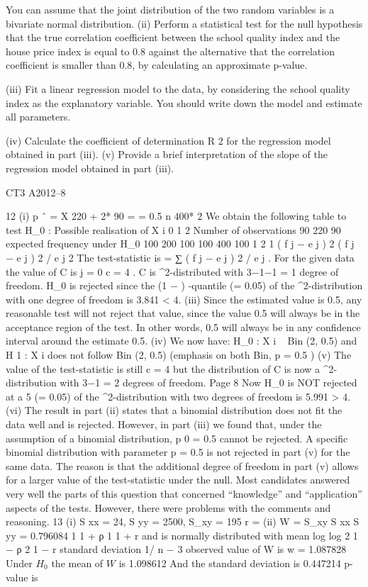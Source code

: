 \documentclass[a4paper,12pt]{article}
\begin{document}
You can assume that the joint distribution of the two random variables is a bivariate
normal distribution.
(ii) Perform a statistical test for the null hypothesis that the true correlation
coefficient between the school quality index and the house price index is
equal to 0.8 against the alternative that the correlation coefficient is smaller
than 0.8, by calculating an approximate p-value.

(iii) Fit a linear regression model to the data, by considering the school quality
index as the explanatory variable. You should write down the model and
estimate all parameters.

(iv) Calculate the coefficient of determination R 2 for the regression model
obtained in part (iii).
(v)
Provide a brief interpretation of the slope of the regression model obtained in
part (iii).



CT3 A2012–8


12
(i)
p ˆ =
X 220 + 2* 90
=
= 0.5
n
400* 2
We obtain the following table to test H_{0} :
Possible realisation of X i 0 1 2
Number of observations 90 220 90
expected frequency under H_{0} 100 200 100
100 400 100
1 2 1
( f j − e j ) 2
( f j − e j ) 2 / e j
2
The test-statistic is = ∑ ( f j − e j ) 2 / e j . For the given data the value of C is
j = 0
c = 4 .
C is \chi^2-distributed with 3−1−1 = 1 degree of freedom.
H_{0} is rejected since the (1 − \alpha ) -quantile (\alpha = 0.05) of the \chi^2-distribution with
one degree of freedom is 3.841 < 4.
(iii) Since the estimated value is 0.5, any reasonable test will not reject that value,
since the value 0.5 will always be in the acceptance region of the test. In other
words, 0.5 will always be in any confidence interval around the estimate 0.5.
(iv) We now have: H_{0} : X i ~ Bin (2, 0.5) and
H 1 : X i does not follow Bin (2, 0.5) (emphasis on both Bin, p = 0.5 )
(v)
The value of the test-statistic is still c = 4 but the distribution of C is now a
\chi^2-distribution with 3−1 = 2 degrees of freedom.
Page 8%
Now H_{0} is NOT rejected at a 5%
(\alpha = 0.05) of the \chi^2-distribution with two degrees of freedom is
5.991 > 4.
(vi)
The result in part (ii) states that a binomial distribution does not fit the data
well and is rejected. However, in part (iii) we found that, under the assumption
of a binomial distribution, p 0 = 0.5 cannot be rejected. A specific binomial
distribution with parameter p = 0.5 is not rejected in part (v) for the same
data. The reason is that the additional degree of freedom in part (v) allows for
a larger value of the test-statistic under the null.
Most candidates answered very well the parts of this question that concerned “knowledge”
and “application” aspects of the tests. However, there were problems with the comments and
reasoning.
13
(i)
S xx = 24, S yy = 2500, S_{xy} = 195
r =
(ii)
W =
S_{xy}
S xx S yy
= 0.796084
1
1 + ρ
1
1 + r
and
is normally distributed with mean log
log
2
1 − ρ
2
1 − r
standard deviation 1/ n − 3
observed value of W is w = 1.087828
Under $H_{0}$ the mean of $W$ is 1.098612
And the standard deviation is 0.447214
p-value is 
\end{document}
